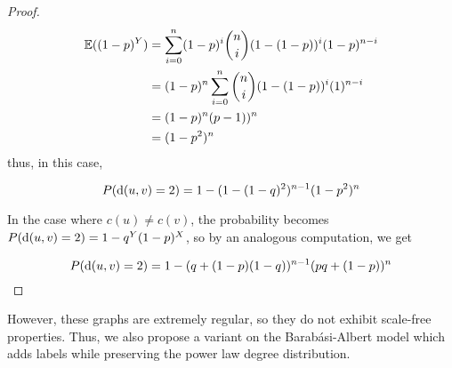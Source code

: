 \begin{proof}
  \begin{align*}
    \mathbb{E}((1-p)^Y) &= \sum_{i=0}^{n}(1-p)^i{n \choose i}(1-(1-p))^i(1-p)^{n-i} \\
            &= (1-p)^{n}\sum_{i=0}^{n}{n \choose i}(1-(1-p))^i(1)^{n-i} \\
            &= (1-p)^{n}(p-1))^{n} \\
            &= (1 - p^2)^{n}
  \end{align*}
  thus, in this case,

  \[ P(\mathrm{d}(u,v) = 2) = 1 - (1 - (1-q)^2)^{n-1}(1-p^2)^n \]

  In the case where $c(u) \neq c(v)$, the probability becomes $P(\mathrm{d}(u,v) = 2) = 1 - q^Y(1-p)^X$, so
  by an analogous computation, we get

  \[ P(\mathrm{d}(u,v) = 2) = 1 - (q + (1-p)(1-q))^{n-1}(pq + (1-p))^n \]
\end{proof}


However, these graphs are extremely regular, so they do not exhibit scale-free properties. Thus, we
also propose a variant on the Barab\'asi-Albert model which adds labels while preserving the power law
degree distribution.



